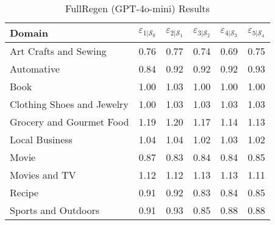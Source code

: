 \begin{table}[h]
    \centering
    \scriptsize
    \def\arraystretch{.99}
    \setlength{\tabcolsep}{0.42em}
    \begin{tabular}{lccccc}
      \toprule
      \textbf{Domain} & $\varepsilon_{1|\mathcal{S}_0}$ & $\varepsilon_{2|\mathcal{S}_1}$ & $\varepsilon_{3|\mathcal{S}_2}$ & $\varepsilon_{4|\mathcal{S}_3}$ & $\varepsilon_{5|\mathcal{S}_4}$ \\
      \midrule
      Art Crafts and Sewing     & 0.76 & 0.77 & 0.74 & 0.69 & 0.75 \\
      Automative                & 0.84 & 0.92 & 0.92 & 0.92 & 0.93 \\
      Book                      & 1.00 & 1.03 & 1.00 & 1.00 & 1.00 \\
      Clothing Shoes and Jewelry& 1.00 & 1.03 & 1.03 & 1.03 & 1.03 \\
      Grocery and Gourmet Food  & 1.19 & 1.20 & 1.17 & 1.14 & 1.13 \\
      Local Business            & 1.04 & 1.04 & 1.02 & 1.03 & 1.02 \\
      Movie                     & 0.87 & 0.83 & 0.84 & 0.84 & 0.85 \\
      Movies and TV             & 1.12 & 1.12 & 1.13 & 1.13 & 1.11 \\
      Recipe                    & 0.91 & 0.92 & 0.83 & 0.84 & 0.85 \\
      Sports and Outdoors       & 0.91 & 0.93 & 0.85 & 0.88 & 0.88 \\
      \bottomrule
    \end{tabular}
    \caption{FullRegen (GPT-4o-mini) Results}
    \label{tab:fullregen_results}
    \vspace{-0.1cm}
  \end{table}
  


